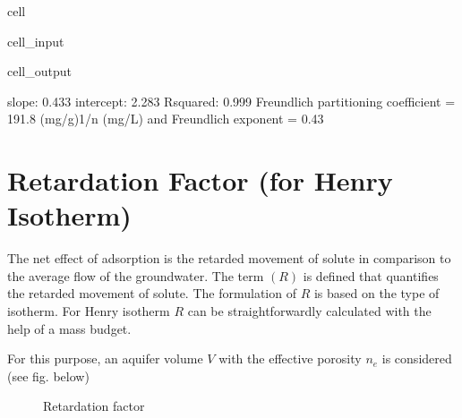\documentclass[letterpaper,10pt,english]{jupyterBook}
\begin{document}
\begin{sphinxuseclass}{cell}
\begin{sphinxVerbatimInput}
\begin{sphinxuseclass}{cell_input}
\end{sphinxuseclass}\end{sphinxVerbatimInput}
\begin{sphinxVerbatimOutput}

\begin{sphinxuseclass}{cell_output}
\begin{sphinxVerbatim}[commandchars=\\\{\}]
slope: 0.433    intercept: 2.283  R\PYGZhy{}squared: 0.999
Freundlich partitioning coefficient =  191.8 (mg/g)1/n (mg/L) and  Freundlich exponent = 0.43
\end{sphinxVerbatim}

\noindent{}

\end{sphinxuseclass}\end{sphinxVerbatimOutput}

\end{sphinxuseclass}

\section{Retardation Factor (for Henry Isotherm)}
\label{\detokenize{content/transport/L10/22_reactive_transport:retardation-factor-for-henry-isotherm}}
\sphinxAtStartPar
The net effect of adsorption is the retarded movement of solute in comparison to the average flow of the groundwater. The term  \((R)\) is defined that quantifies the retarded movement of solute. The formulation of \(R\) is based on the type of isotherm. For Henry isotherm \(R\) can be straightforwardly calculated with the help of a mass budget.

\sphinxAtStartPar
For this purpose, an aquifer volume \(V\) with the effective porosity \(n_e\) is considered (see fig. below)

\begin{figure}[htbp]
\centering
\capstart

\noindent{}
\caption{Retardation factor}\label{\detokenize{content/transport/L10/22_reactive_transport:retardation}}\end{figure}
\end{document}
